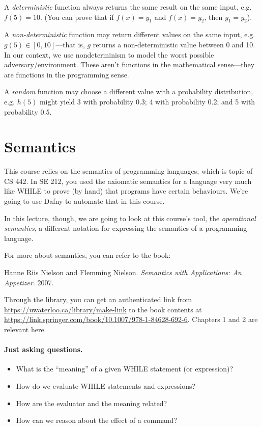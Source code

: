 \documentclass[11pt]{article}
\begin{document}
A \emph{deterministic} function always returns the same result on the same input, e.g. $f(5) = 10$. (You can prove that if $f(x) = y_1$ and $f(x) = y_2$, then $y_1 = y_2$).

A \emph{non-deterministic} function may return different values on the same input, e.g. $g(5) \in [0, 10]$---that is,
$g$ returns a non-deterministic value between 0 and 10. In our context, we use nondeterminism to model the worst possible adversary/environment. These aren't functions in the mathematical sense---they are functions in the programming sense.

A \emph{random} function may choose a different value with a probability distribution, e.g. $h(5)$ might yield 3 with probability 0.3; 4 with probability 0.2; and 5 with probability 0.5.

\section*{Semantics}
This course relies on the semantics of programming languages, which is
topic of CS 442. In SE 212, you used the axiomatic semantics for a
language very much like WHILE to prove (by hand) that programs have
certain behaviours. We're going to use Dafny to automate that in this
course.

In this lecture, though, we are going to look at this course's tool,
the \emph{operational semantics}, a different notation for expressing the
semantics of a programming language.

For more about semantics, you can refer to the book:

\hspace*{2em}
Hanne Riis Nielson and Flemming Nielson. \emph{Semantics with Applications: An Appetizer}. 2007.

Through the library, you can get an authenticated link from
\url{https://uwaterloo.ca/library/make-link} to the book contents at
\url{https://link.springer.com/book/10.1007/978-1-84628-692-6}. Chapters
1 and 2 are relevant here.

\paragraph{Just asking questions.}
\begin{itemize}[noitemsep]
\item What is the ``meaning'' of a given WHILE statement (or expression)?
\item How do we evaluate WHILE statements and expressions?
\item How are the evaluator and the meaning related?
\item How can we reason about the effect of a command?
\end{itemize}
\end{document}
